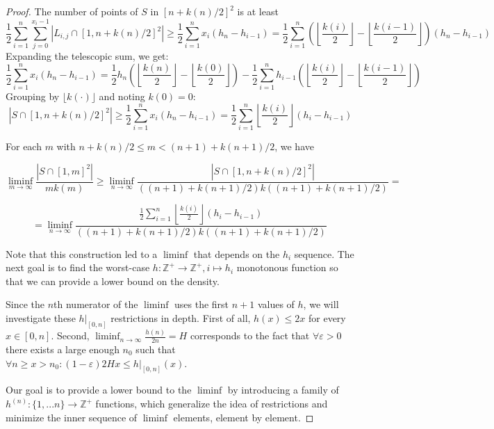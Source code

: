 \documentclass[11pt,a4paper]{article}
\numberwithin{equation}{section}
\newcommand{\Z}{\mathbb{Z}}
\begin{document}
\begin{proof}
\noindent The number of points of $S$ in $[n+k(n)/2]^2$ is at least
$$
\frac{1}{2} \sum _{i = 1}^n \sum _{j = 0}^{x_i-1} \left|L_{i,j}\cap [1,n+k(n)/2]^2\right|\ge \frac{1}{2}\sum_{i=1}^{n} x_i (h_n - h_{i-1}) = 
\frac{1}{2}\sum_{i=1}^{n} \left(\left\lfloor \frac{k(i)}{2} \right\rfloor - \left\lfloor \frac{k(i-1)}{2} \right\rfloor\right) (h_n - h_{i-1})
$$
Expanding the telescopic sum, we get:
$$ \frac{1}{2}\sum_{i=1}^{n} x_i (h_n - h_{i-1}) = \frac{1}{2} h_n \left(\left\lfloor \frac{k(n)}{2} \right\rfloor - \left\lfloor \frac{k(0)}{2} \right\rfloor \right) - \frac{1}{2}\sum_{i=1}^{n} h_{i-1} \left( \left\lfloor \frac{k(i)}{2} \right\rfloor - \left\lfloor \frac{k(i-1)}{2} \right\rfloor \right) 
$$
Grouping by $\lfloor k(\cdot) \rfloor$ and noting $k(0)=0$: 
$$
\left|S\cap [1, n+k(n)/2]^2\right| \ge \frac{1}{2}\sum_{i=1}^{n} x_i (h_n - h_{i-1}) = \frac{1}{2}\sum_{i=1}^{n} \left\lfloor \frac{k(i)}{2} \right\rfloor (h_i - h_{i-1})
$$

For each $m$ with $n+k(n)/2\le m < (n+1)+k(n+1)/2$, we have
    
$$  \displaystyle\liminf_{m\to\infty} \frac{\left|S \cap [1,m]^2\right|}{m k(m)}\ge \displaystyle\liminf_{n\to\infty} \frac{\left|S \cap [1,n +k(n)/2]^2\right|}{\left((n+1) + k(n+1)/2\right)k\left((n+1) + k(n+1)/2\right)}=$$

$$
=\displaystyle\liminf_{n\to\infty}\frac{\displaystyle\frac{1}{2}\sum_{i=1}^{n} \left\lfloor \frac{k(i)}{2} \right\rfloor (h_i - h_{i-1})}{\left((n+1) + k(n+1)/2\right)k\left((n+1) + k(n+1)/2\right)}\
$$

Note that this construction led to a $\liminf$ that depends on the $h_i$ sequence. The next goal is to find the worst-case $h: \Z^+ \to \Z^+, i \mapsto h_i$ monotonous function so that we can provide a lower bound on the density.

Since the $n$th numerator of the $\liminf$ uses the first $n+1$ values of $h$, we will investigate these $h |_{[0,n]}$ restrictions in depth. First of all, $h(x) \le 2 x$ for every  $x \in [0, n]$. Second, $\liminf_{n \to \infty} \frac{h(n)}{2n} = H$ corresponds to the fact that $\forall \varepsilon > 0$ there exists a large enough $n_0$ such that $\forall n \ge x > n_0: (1 - \varepsilon) 2Hx \le h|_{[0,n]} (x)$.

Our goal is to provide a lower bound to the $\liminf$ by introducing a family of $h^{(n)}: \{1,...n\} \to \Z^+$ functions, which generalize the idea of restrictions and minimize the inner sequence of $\liminf$ elements, element by element.


\end{proof}
\end{document}
